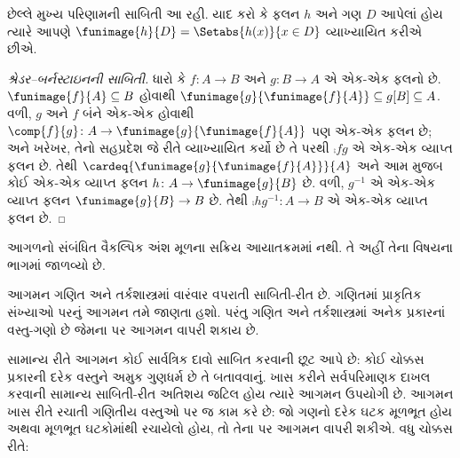 છેલ્લે મુખ્ય પરિણામની સાબિતી આ રહી. યાદ કરો કે ફલન $h$ અને ગણ $D$
આપેલાં હોય ત્યારે આપણે $\funimage{h}{D} = \Setabs{h(x)}{x
\in D}$ વ્યાખ્યાયિત કરીએ છીએ.

\begin{proof}[શ્રેડર--બર્નસ્ટાઇનની સાબિતી] ધારો કે $f \colon A \to B$
અને $g \colon B \to A$ એ એક-એક ફલનો છે. $\funimage{f}{A}
\subseteq B$ હોવાથી $\funimage{g}{\funimage{f}{A}} \subseteq
g[B] \subseteq A$. વળી, $g$ અને $f$ બંને એક-એક હોવાથી
$\comp{f}{g} \colon A \to \funimage{g}{\funimage{f}{A}}$ પણ
એક-એક ફલન છે; અને ખરેખર, તેનો સહપ્રદેશ જે રીતે વ્યાખ્યાયિત કર્યો
છે તે પરથી $\comp{f}{g}$ એ એક-એક વ્યાપ્ત ફલન છે. તેથી
$\cardeq{\funimage{g}{\funimage{f}{A}}}{A}$ અને આમ
 મુજબ કોઈ એક-એક વ્યાપ્ત ફલન $h \colon A \to
\funimage{g}{B}$ છે. વળી, $g^{-1}$ એ એક-એક વ્યાપ્ત ફલન
$\funimage{g}{B} \to B$ છે. તેથી $\comp{h}{g^{-1}} \colon A \to B$
એ એક-એક વ્યાપ્ત ફલન છે.
\end{proof}
\endgroup
\endgroup


\OLEndPartHook

\begin{editorial}
આગળનો સંબંધિત વૈકલ્પિક અંશ મૂળના સક્રિય આયાતક્રમમાં નથી. તે અહીં તેના વિષયના ભાગમાં જાળવ્યો છે.
\end{editorial}
\begingroup
\makeatletter{}\makeatother


\label{guunit:OLP-0718}


\begin{explain}
આગમન ગણિત અને તર્કશાસ્ત્રમાં વારંવાર વપરાતી સાબિતી-રીત છે.
ગણિતમાં પ્રાકૃતિક સંખ્યાઓ પરનું આગમન તમે જાણતા હશો.
પરંતુ ગણિત અને તર્કશાસ્ત્રમાં અનેક પ્રકારનાં વસ્તુ-ગણો છે
જેમના પર આગમન વાપરી શકાય છે.

સામાન્ય રીતે આગમન કોઈ સાર્વત્રિક દાવો સાબિત કરવાની છૂટ આપે છે:
કોઈ ચોક્કસ પ્રકારની દરેક વસ્તુને અમુક ગુણધર્મ છે તે બતાવવાનું.
ખાસ કરીને સર્વપરિમાણક દાખલ કરવાની સામાન્ય સાબિતી-રીત
અતિશય જટિલ હોય ત્યારે આગમન ઉપયોગી છે.
આગમન ખાસ રીતે રચાતી ગણિતીય વસ્તુઓ પર જ કામ કરે છે:
જો ગણનો દરેક ઘટક મૂળભૂત હોય અથવા મૂળભૂત ઘટકોમાંથી
રચાયેલો હોય, તો તેના પર આગમન વાપરી શકીએ.
વધુ ચોક્કસ રીતે:
\end{explain}

